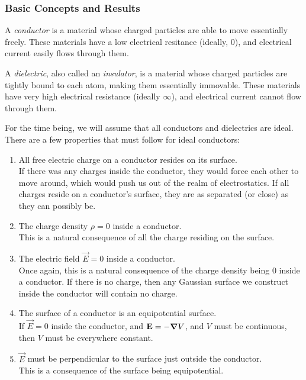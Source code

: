 \documentclass[a4paper]{article}
\begin{document}
\subsubsection{Basic Concepts and Results}
\begin{defi}[Conductor]
	A \emph{conductor} is a material whose charged particles are
	able to move essentially freely. These materials have a low
	electrical resitance (ideally, 0), and electrical current easily flows
	through them.
\end{defi}
\begin{defi}[Dielectric]
	A \emph{dielectric}, also called an \emph{insulator}, is a material
	whose charged particles are tightly bound to each atom, making them
	essentially immovable. These materials have very high electrical
	resistance (ideally $\infty$), and electrical current cannot flow
	through them.
\end{defi}
For the time being, we will assume that all conductors and dielectrics are
ideal. There are a few properties that must follow for ideal conductors:
\begin{enumerate}
	\item All free electric charge on a conductor resides on its surface.\\
		If there was any charges inside the conductor, they would
		force each other to move around, which would push us out of
		the realm of electrostatics. If all charges reside on a
		conductor's surface, they are as separated (or close) as they
		can possibly be.
	\item The charge density $\rho = 0$ inside a conductor.\\
		This is a natural consequence of all the charge residing
		on the surface.
	\item The electric field $\vec{E} = 0$ inside a conductor.\\
		Once again, this is a natural consequence of the charge density
		being 0 inside a conductor. If there is no charge, then any
		Gaussian surface we construct inside the conductor will
		contain no charge.
	\item The surface of a conductor is an equipotential surface.\\
		If $\vec{E} = 0$ inside the conductor, and
		$\boldsymbol{\mathbf{E}} = -\boldsymbol{\mathbf{\nabla}} V$, and $V$ must be continuous, then
		$V$ must be everywhere constant.
	\item $\vec{E}$ must be perpendicular to the surface just outside the
		conductor.\\
		This is a consequence of the surface being equipotential.
\end{enumerate}
\end{document}
